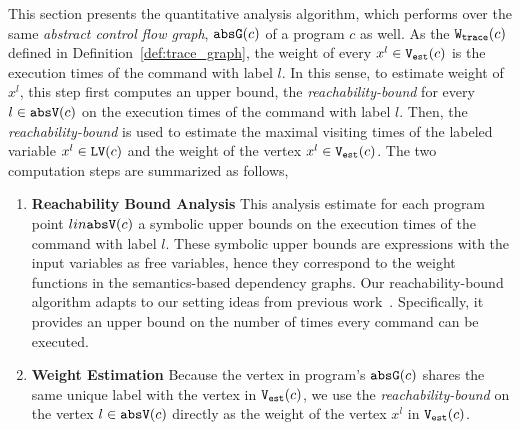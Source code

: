 This section presents the quantitative analysis algorithm, which performs over the same \emph{abstract control flow graph}, $\mathtt{abs}{\mathtt{G}}(c)$ of a program $c$ as well. 
As the $\mathtt{{W_{trace}}}(c)$ defined in Definition~\ref{def:trace_graph}, the weight of every $x^l \in \mathtt{{V_{est}}}(c)$ is
the execution times of the command with label $l$. 
In this sense, to estimate weight of $x^l$, this step first computes an upper bound, the \emph{reachability-bound}\cite{GulwaniZ10} for every $l \in \mathtt{abs}{\mathtt{V}}(c)$
on the execution times of the command with label $l$. 
Then, the \emph{reachability-bound} is used to estimate the maximal visiting times of the labeled variable $x^l \in \mathtt{LV}(c)$
and 
the weight of the vertex $x^l \in \mathtt{{V_{est}}}(c)$.
The two computation steps are summarized as follows,
\begin{enumerate}
  \item \textbf{Reachability Bound Analysis}
  This analysis estimate for each program point $l in \mathtt{abs}{\mathtt{V}}(c)$ a symbolic upper bounds on the execution times of the command with label $l$. 
  These symbolic upper bounds are expressions with the input variables as free variables, hence they correspond to the weight functions in the semantics-based dependency graphs. 
  Our reachability-bound algorithm adapts to our setting ideas from previous work~\cite{ZulegerGSV11, SinnZV14, sinn2017complexity}.
  Specifically, it provides an upper bound on the number of times every command can be executed.
    \item \textbf{Weight Estimation}
    Because
    the vertex in program's $\mathtt{abs}{\mathtt{G}}(c)$ shares the same unique label with the vertex in $\mathtt{{V_{est}}}(c)$, 
    we use the \emph{reachability-bound} on the vertex $l \in \mathtt{abs}{\mathtt{V}}(c)$ directly as the weight of the vertex $x^l$ in $\mathtt{{V_{est}}}(c)$.
\end{enumerate}


